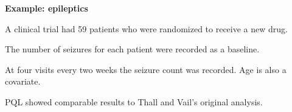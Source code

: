 \documentclass[mathserif, 11pt, t]{beamer}
\renewcommand{\subtitle}[1]{\vspace{0.45cm}\textcolor{bluegreen}{
    {\textbf{#1}}}\vspace{0.15cm}\newline}
\begin{document}
\begin{frame}
\subtitle{Example: epileptics}

A clinical trial had 59 patients who were randomized to receive a new drug.
\bigskip

The number of seizures for each patient were recorded as a baseline.
\bigskip

At four visits every two weeks the seizure count was recorded. Age is also a covariate.
\bigskip

PQL showed comparable results to Thall and Vail's original analysis.
\end{frame}


\begin{frame}
\end{frame}
\end{document}
